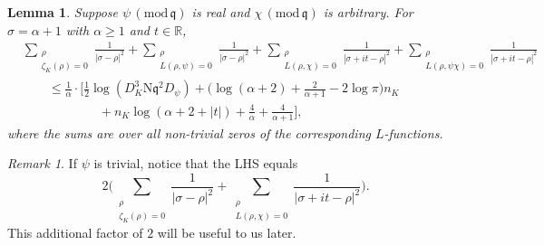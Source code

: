 \documentclass[12pt,psamsfonts]{amsart}
\newtheorem{lem}[thm]{Lemma}
\theoremstyle{definition}
\theoremstyle{remark}
\numberwithin{equation}{section}
\theoremstyle{plain}
\theoremstyle{remark}
\newtheorem*{rem*}{Remark}
\renewcommand{\1}{ {\bf 1}}
\renewcommand{\pmod}[1]{\, (\mathrm{mod} {\, #1})}
\newcommand{\N}{\mathrm{N}}
\newcommand{\kq}{\mathfrak{q}}
\newcommand{\R}{\mathbb{R}}
\begin{document}
 \begin{lem} \label{DH-ZeroSum} Suppose $\psi \pmod{\kq}$ is real and $\chi \pmod{\kq}$ is arbitrary. For $\sigma = \alpha+1$ with $\alpha \geq 1$ and $t \in \R$, 
\begin{align*}
& \sum_{\substack{\rho \\  \zeta_K(\rho) = 0}} \frac{1}{|\sigma-\rho|^2}  + \sum_{\substack{\rho \\  L(\rho, \psi) = 0}}  \frac{1}{|\sigma -\rho|^2}    + \sum_{\substack{\rho \\  L(\rho, \chi) = 0}}  \frac{1}{|\sigma + it -\rho|^2}  + \sum_{\substack{\rho \\  L(\rho, \psi\chi) = 0}}  \frac{1}{|\sigma +it -\rho|^2} \\
& \qquad \leq \frac{1}{\alpha} \cdot \Big[ \frac{1}{2}\log(D_K^3 \N\kq^2 D_{\psi} )  +\Big( \log(\alpha+2) + \frac{2}{\alpha+1} - 2\log \pi \Big) n_K \\
& \qquad\qquad\qquad +  n_K \log( \alpha+2+|t|) + \frac{4}{\alpha} + \frac{4}{\alpha+1} \Big],  
\end{align*}
where the sums are over all non-trivial zeros  of the corresponding $L$-functions. 
\end{lem}
\begin{rem*} If $\psi$ is trivial, notice that the LHS equals 
\[
2  \Big( \sum_{\substack{\rho \\  \zeta_K(\rho) = 0}} \frac{1}{|\sigma-\rho|^2} +  \sum_{\substack{\rho \\  L(\rho, \chi) = 0}}  \frac{1}{|\sigma + it -\rho|^2} \Big). 
\]
This additional factor of $2$ will be useful to us later. 
\end{rem*}
\end{document}
